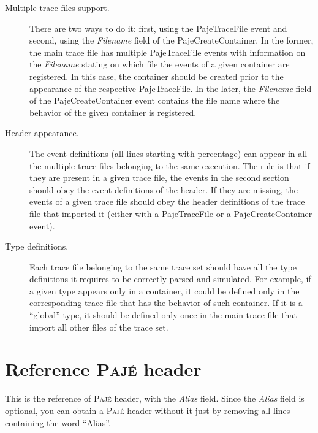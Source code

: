 \documentclass[12pt]{article}
\newcommand{\Paje}{\textsc{Paj\'e}\xspace}
\newcommand{\PajeField}[1]{\emph{#1}\xspace}
\newcommand{\Alias}{\PajeField{Alias}}
\newcommand{\Filename}{\PajeField{Filename}}
\newcommand{\PajeEvent}[1]{\textsf{#1}\xspace}
\newcommand{\PajeCreateContainer}{\PajeEvent{PajeCreateContainer}}
\newcommand{\PajeTraceFile}{\PajeEvent{PajeTraceFile}}
\begin{document}
\begin{description}
\item[Multiple trace files support.] There are two ways to do it:
  first, using the \PajeTraceFile event and second, using the
  \Filename field of the \PajeCreateContainer. In the former, the main
  trace file has multiple \PajeTraceFile events with information on
  the \Filename stating on which file the events of a given container
  are registered. In this case, the container should be created prior
  to the appearance of the respective \PajeTraceFile. In the later,
  the \Filename field of the \PajeCreateContainer event contains the
  file name where the behavior of the given container is registered.

\item[Header appearance.] The event definitions (all lines starting
  with percentage) can appear in all the multiple trace files
  belonging to the same execution. The rule is that if they are
  present in a given trace file, the events in the second section
  should obey the event definitions of the header. If they are
  missing, the events of a given trace file should obey the header
  definitions of the trace file that imported it (either with a
  \PajeTraceFile or a \PajeCreateContainer event).

\item[Type definitions.] Each trace file belonging to the same trace
  set should have all the type definitions it requires to be correctly
  parsed and simulated. For example, if a given type appears only in a
  container, it could be defined only in the corresponding trace file
  that has the behavior of such container. If it is a ``global'' type,
  it should be defined only once in the main trace file that import
  all other files of the trace set.

\end{description}

\section{Reference \Paje header}
\label{s.PajeHeaders}

This is the reference of \Paje header, with the \Alias field. Since
the \Alias field is optional, you can obtain a \Paje header without it
just by removing all lines containing the word ``Alias''.
\end{document}
